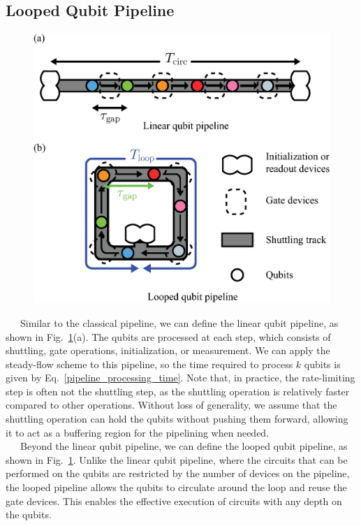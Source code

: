 \documentclass[a4paper,11pt]{ltjsarticle}
\begin{document}
{    \subsection{Looped Qubit Pipeline}{
        \begin{figure}[h]
            \centering
            \includegraphics[scale=0.50]{figure/shuttling_track.eps}
            \vspace{0pt}\caption{}
            \label{shuttling_truck}
        \end{figure}

        \ \ \ Similar to the classical pipeline, we can define the linear qubit pipeline, as shown in Fig.~\ref{shuttling_truck}(a). The qubits are processed at each step, which consists of shuttling, gate operations, initialization, or measurement. We can apply the steady-flow scheme to this pipeline, so the time required to process $k$ qubits is given by Eq.~\ref{pipeline_processing_time}. Note that, in practice, the rate-limiting step is often not the shuttling step, as the shuttling operation is relatively faster compared to other operations. Without loss of generality, we assume that the shuttling operation can hold the qubits without pushing them forward, allowing it to act as a buffering region for the pipelining when needed.\\
        \ \ \ Beyond the linear qubit pipeline, we can define the looped qubit pipeline, as shown in Fig.~\ref{shuttling_truck}. Unlike the linear qubit pipeline, where the circuits that can be performed on the qubits are restricted by the number of devices on the pipeline, the looped pipeline allows the qubits to circulate around the loop and reuse the gate devices. This enables the effective execution of circuits with any depth on the qubits.

    }
}
\end{document}
